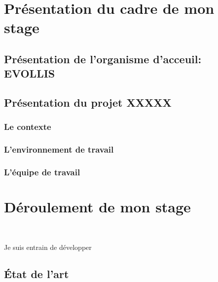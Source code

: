 




\begin{abstract}
  
\end{abstract}

\tableofcontents





\part{Présentation du cadre de mon stage}

\chapter{Présentation de l'organisme d'acceuil: {\sf EVOLLIS}}
\chapter{Présentation du projet \sf XXXXX}
\section{Le contexte}
\section{L'environnement de travail}
\section{L'équipe de travail}

\part{Déroulement de mon stage}

\newpage
~
\vspace{7cm}
\begin{center}
  \textsf{Je suis entrain de développer } 
\end{center}
\newpage

\chapter{État de l'art}
\thispagestyle{plain}


